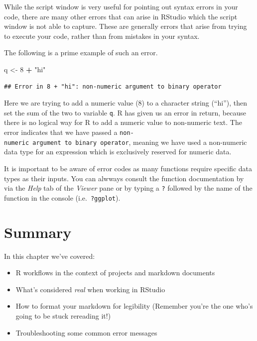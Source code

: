 \documentclass[
]{book}
\newenvironment{Shaded}{\begin{snugshade}}{\end{snugshade}}
\newcommand{\DecValTok}[1]{\textcolor[rgb]{0.00,0.00,0.81}{#1}}
\newcommand{\NormalTok}[1]{#1}
\newcommand{\OtherTok}[1]{\textcolor[rgb]{0.56,0.35,0.01}{#1}}
\newcommand{\SpecialCharTok}[1]{\textcolor[rgb]{0.81,0.36,0.00}{\textbf{#1}}}
\newcommand{\StringTok}[1]{\textcolor[rgb]{0.31,0.60,0.02}{#1}}
\providecommand{\tightlist}{%
  \setlength{\itemsep}{0pt}\setlength{\parskip}{0pt}}
\begin{document}
While the script window is very useful for pointing out syntax errors in your code, there are many other errors that can arise in RStudio which the script window is not able to capture. These are generally errors that arise from trying to execute your code, rather than from mistakes in your syntax.

The following is a prime example of such an error.

\begin{Shaded}
\begin{Highlighting}[]
\NormalTok{q }\OtherTok{\textless{}{-}} \DecValTok{8} \SpecialCharTok{+} \StringTok{"hi"}
\end{Highlighting}
\end{Shaded}

\begin{verbatim}
## Error in 8 + "hi": non-numeric argument to binary operator
\end{verbatim}

Here we are trying to add a numeric value (8) to a character string (``hi''), then set the sum of the two to variable \texttt{q}. R has given us an error in return, because there is no logical way for R to add a numeric value to non-numeric text. The error indicates that we have passed a \texttt{non-numeric\ argument\ to\ binary\ operator}, meaning we have used a non-numeric data type for an expression which is exclusively reserved for numeric data.

It is important to be aware of error codes as many functions require specific data types as their inputs. You can alwways consult the function documentation by via the \emph{Help} tab of the \emph{Viewer} pane or by typing a \texttt{?} followed by the name of the function in the console (i.e.~\texttt{?ggplot}).

\hypertarget{summary-3}{%
\section{Summary}\label{summary-3}}

In this chapter we've covered:

\begin{itemize}
\tightlist
\item
  R workflows in the context of projects and markdown documents
\item
  What's considered \emph{real} when working in RStudio
\item
  How to format your markdown for legibility (Remember you're the one who's going to be stuck rereading it!)
\item
  Troubleshooting some common error messages
\end{itemize}
\end{document}
